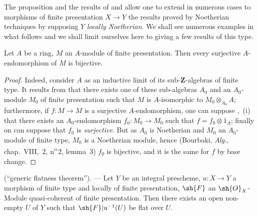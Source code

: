 \begin{env}[8.9.2]
\label{IV.8.9.2}
The proposition  and the results of  and  allow one to extend in numerous cases to morphisms of finite presentation $X\to Y$ the results proved by Noetherian techniques by supposing $Y$ \emph{locally Noetherian}.
We shall see numerous examples in what follows and we shall limit ourselves here to giving a few results of this type.
\end{env}

\begin{proposition}[8.9.3]
\label{IV.8.9.3}
Let $A$ be a ring, $M$ an $A$-module of finite presentation.
Then every surjective $A$-endomorphism of $M$ is bijective.
\end{proposition}

\begin{proof}
Indeed, consider $A$ as an inductive limit of its sub-$\mathbf{Z}$-algebras of finite type.
It results from  that there exists one of these sub-algebras $A_0$ and an $A_0$-module $M_0$ of finite presentation such that $M$ is $A$-isomorphic to $M_0\otimes_{A_0}A$; furthermore, if $f:M\to M$ is a surjective $A$-endomorphism, one can suppose ,~(i) that there exists an $A_0$-endomorphism $f_0:M_0\to M_0$ such that $f=f_0\otimes 1_A$; finally  on can suppose that $f_0$ is \emph{surjective}.
But as $A_0$ is Noetherian and $M_0$ an $A_0$-module of finite type, $M_0$ is a Noetherian module, hence (Bourbaki, \emph{Alg.}, chap.~VIII, \textsection\,2, n\textsuperscript{o}\,2, lemma~3) $f_0$ is bijective, and it is the same for $f$ by base change.
\end{proof}

\begin{proposition}[8.9.4]
\label{IV.8.9.4}
(``generic flatness theorem''). --- Let $Y$ be an integral prescheme, $u:X\to Y$ a morphism of finite type and locally of finite presentation, $\sh{F}$ an $\sh{O}_X$-Module quasi-coherent of finite presentation.
Then there exists an open non-empty $U$ of $Y$ such that $\sh{F}|u^{-1}(U)$ be flat over $U$.
\end{proposition}


